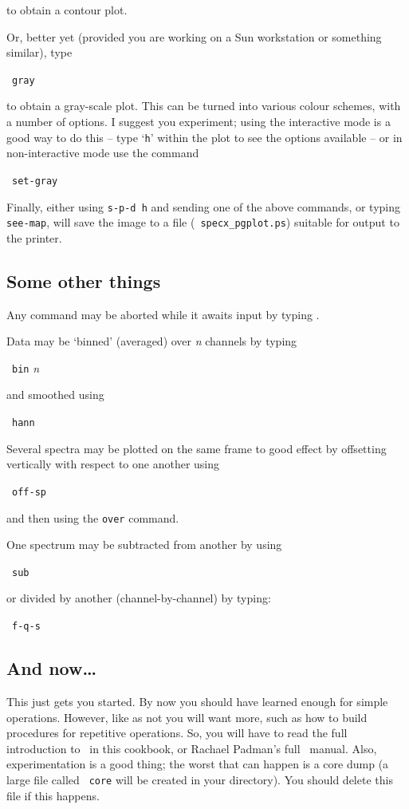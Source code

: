 to obtain a contour plot.

Or, better yet (provided you are working on a Sun workstation or
something similar), type

\SP\ {\tt gray}

to obtain a gray-scale plot. This can be turned into various colour
schemes, with a number of options. I suggest you experiment; using the
interactive mode is a good way to do this -- type `{\tt{h}}' within the
plot to see the options available -- or in non-interactive mode use
the command

\SP\ {\tt set-gray}

Finally, either using {\tt s-p-d h} and sending one of the above
commands, or typing {\tt see-map}, will save the image to a file
(\eg\ {\tt{specx\_pgplot.ps}}) suitable for output to the printer.

\subsection{Some other things}
Any command may be aborted while it awaits input by typing \ctrlc .

Data may be `binned' (averaged) over {\it n} channels by typing 

\SP\ {\tt bin} {\it n}

and smoothed using 

\SP\ {\tt hann}

Several spectra may be plotted on the same frame to good effect by
offsetting vertically with respect to one another using

\SP\ {\tt off-sp}

and then using the {\tt over} command.

One spectrum may be subtracted from another by using

\SP\ {\tt sub}

or divided by another (channel-by-channel) by typing:

\SP\ {\tt f-q-s}

\subsection{And now\ldots}
This just gets you started. By now you should have learned enough for
simple operations. However, like as not you will want more, such as how
to build procedures for repetitive operations. So, you will have to
read the full introduction to \SPECX\ in this cookbook, or Rachael
Padman's full \SPECX\ manual. Also, experimentation is a good thing;
the worst that can happen is a core dump (a large file called {\tt
core} will be created in your directory). You should delete this file 
if this happens.

